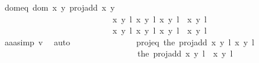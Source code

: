 \begin{isabellebody}
\ dom{\isacharunderscore}eq{\isacharcolon}\ {\isachardoublequoteopen}{\isacharparenleft}dom\ {\isacharparenleft}{\isasymlambda}{\isacharparenleft}x{\isacharcomma}\ y{\isacharparenright}{\isachardot}\ proj{\isacharunderscore}add\ x\ y{\isacharparenright}\ {\isasyminter}\isanewline
\ \ \ \ \ \ \ \ \ \ \ \ \ \ \ \ \ \ \ \ \ \ \ \ \ \ \ {\isacharbraceleft}{\isacharparenleft}{\isacharparenleft}{\isacharparenleft}x{\isacharcomma}\ y{\isacharparenright}{\isacharcomma}\ l{\isacharparenright}{\isacharcomma}\ {\isacharparenleft}x{\isacharprime}{\isacharcomma}\ y{\isacharprime}{\isacharparenright}{\isacharcomma}\ l{\isacharprime}{\isacharparenright}{\isacharcomma}\ {\isacharparenleft}{\isacharparenleft}{\isacharparenleft}x{\isacharcomma}\ y{\isacharparenright}{\isacharcomma}\ l{\isacharparenright}{\isacharcomma}\ {\isasymtau}\ {\isacharparenleft}x{\isacharprime}{\isacharcomma}\ y{\isacharprime}{\isacharparenright}{\isacharcomma}\ l{\isacharprime}\ {\isacharplus}\ {}{\isacharparenright}{\isacharbraceright}{\isacharparenright}\ {\isacharequal}\isanewline
\ \ \ \ \ \ \ \ \ \ \ \ \ \ \ \ \ \ \ \ \ \ \ \ \ \ \ {\isacharbraceleft}{\isacharparenleft}{\isacharparenleft}{\isacharparenleft}x{\isacharcomma}\ y{\isacharparenright}{\isacharcomma}\ l{\isacharparenright}{\isacharcomma}\ {\isacharparenleft}x{\isacharprime}{\isacharcomma}\ y{\isacharprime}{\isacharparenright}{\isacharcomma}\ l{\isacharprime}{\isacharparenright}{\isacharcomma}\ {\isacharparenleft}{\isacharparenleft}{\isacharparenleft}x{\isacharcomma}\ y{\isacharparenright}{\isacharcomma}\ l{\isacharparenright}{\isacharcomma}\ {\isasymtau}\ {\isacharparenleft}x{\isacharprime}{\isacharcomma}\ y{\isacharprime}{\isacharparenright}{\isacharcomma}\ l{\isacharprime}\ {\isacharplus}\ {}{\isacharparenright}{\isacharbraceright}\ {\isachardoublequoteclose}\isanewline
\ \ \ \ \ \ \ \ \ \ \ \ \ \ \isamarkupfalse%
\ aaa{\isacharunderscore}simp\ v{}\ \isamarkupfalse%
\ auto\isanewline
\ \ \ \ \ \ \ \ \ \ \ \ \isamarkupfalse%
\ \isamarkupfalse%
\ proj{\isacharunderscore}eq{\isacharcolon}\ {\isachardoublequoteopen}{\isacharbraceleft}the\ {\isacharparenleft}proj{\isacharunderscore}add\ {\isacharparenleft}{\isacharparenleft}x{\isacharcomma}\ y{\isacharparenright}{\isacharcomma}\ l{\isacharparenright}\ {\isacharparenleft}{\isacharparenleft}x{\isacharprime}{\isacharcomma}\ y{\isacharprime}{\isacharparenright}{\isacharcomma}\ l{\isacharprime}{\isacharparenright}{\isacharparenright}{\isacharcomma}\isanewline
\ \ \ \ \ \ \ \ \ \ \ \ \ \ \ \ \ \ \ \ \ \ \ \ \ \ \ \ \ \ \ \ \ the\ {\isacharparenleft}proj{\isacharunderscore}add\ {\isacharparenleft}{\isacharparenleft}x{\isacharcomma}\ y{\isacharparenright}{\isacharcomma}\ l{\isacharparenright}\ {\isacharparenleft}{\isasymtau}\ {\isacharparenleft}x{\isacharprime}{\isacharcomma}\ y{\isacharprime}{\isacharparenright}{\isacharcomma}\ l{\isacharprime}\ {\isacharplus}\ {}{\isacharparenright}{\isacharparenright}{\isacharbraceright}\ {\isacharequal}\isanewline

\end{isabellebody}
